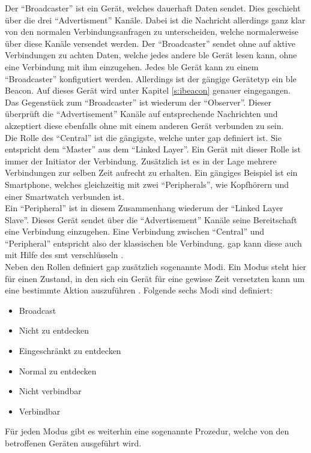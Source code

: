 \noindent Der "`Broadcaster"' ist ein Gerät, welches dauerhaft Daten sendet. Dies geschieht über die drei "`Advertisment"' Kanäle. Dabei ist die Nachricht allerdings ganz klar von den normalen Verbindungsanfragen zu unterscheiden, welche normalerweise über diese Kanäle versendet werden. Der "`Broadcaster"' sendet ohne auf aktive Verbindungen zu achten Daten, welche jedes andere \ac{ble} Gerät lesen kann, ohne eine Verbindung mit ihm einzugehen. Jedes \ac{ble} Gerät kann zu einem "`Broadcaster"' konfigutiert werden. Allerdings ist der gängige Gerätetyp ein \ac{ble} Beacon. Auf dieses Gerät wird unter Kapitel \ref{s:ibeacon} genauer eingegangen.\\ 

\noindent Das Gegenstück zum "`Broadcaster"' ist wiederum der "`Observer"'. Dieser überprüft die "`Advertisement"' Kanäle auf entsprechende Nachrichten und akzeptiert diese ebenfalls ohne mit einem anderen Gerät verbunden zu sein.\\

\noindent Die Rolle des "`Central"' ist die gängigste, welche unter \ac{gap} definiert ist. Sie entspricht dem "`Master"' aus dem "`Linked Layer"'. Ein Gerät mit dieser Rolle ist immer der Initiator der Verbindung. Zusätzlich ist es in der Lage mehrere Verbindungen zur selben Zeit aufrecht zu erhalten. Ein gängiges Beispiel ist ein Smartphone, welches gleichzeitig mit zwei "`Peripherals"', wie Kopfhörern und einer Smartwatch verbunden ist.\\

\noindent Ein "`Peripheral"' ist in diesem Zusammenhang wiederum der "`Linked Layer Slave"'. Dieses Gerät sendet über die "`Advertisement"' Kanäle seine Bereitschaft eine Verbindung einzugehen. Eine Verbindung zwischen "`Central"' und "`Peripheral"' entspricht also der klassischen \ac{ble} Verbindung. \ac{gap} kann diese auch mit Hilfe des \ac{smt} verschlüsseln \cite[Seite 34]{Usama17:BBS}.\\  

\noindent Neben den Rollen definiert \ac{gap} zusätzlich sogenannte Modi. Ein Modus steht hier für einen Zustand, in den sich ein Gerät für eine gewisse Zeit versetzten kann um eine bestimmte Aktion auszuführen \cite[Seite 35]{Townsend14:GSB}. Folgende sechs Modi sind definiert:
\begin{itemize}
	\item{Broadcast}
	\item{Nicht zu entdecken}
	\item{Eingeschränkt zu entdecken}
	\item{Normal zu entdecken}
	\item{Nicht verbindbar}
	\item{Verbindbar}
\end{itemize} 
Für jeden Modus gibt es weiterhin eine sogenannte Prozedur, welche von den betroffenen Geräten ausgeführt wird.\\

